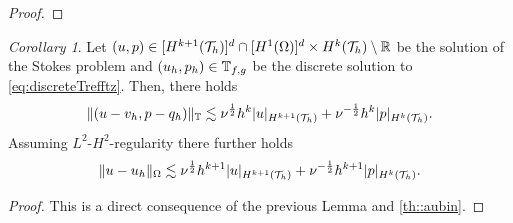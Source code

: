 \documentclass[pdflatex,sn-mathphys,Numbered]{sn-jnl}%
\theoremstyle{remark}%
\newtheorem{cor}[theorem]{Corollary}
\theoremstyle{definition}%
\begin{document}
\begin{proof}
\end{proof}



\begin{cor}
  Let $(u,p) \in [H^{k+1}({\mathcal{T}_h})]^d\cap [H^1(\Omega)]^d \times H^{k}({\mathcal{T}_h}) \setminus \mathbb{R}$ be the solution of the Stokes problem and $(u_h,p_h) \in \mathbb{T}_{f,g}$ be the discrete solution to \eqref{eq:discreteTrefftz}. 
  Then, there holds
  \begin{equation} \label{eq:aprioribound1}
    \Vert (u-v_h,p-q_h) \Vert_{\mathbb{T}} \lesssim \nu^{\frac12} h^{k} \vert u \vert_{H^{k+1}({\mathcal{T}_h})} + \nu^{-\frac12} h^{k} \vert p \vert_{H^{k}({\mathcal{T}_h})}.
  \end{equation}
  Assuming $L^2$-$H^2$-regularity there further holds
  \begin{equation}
    \Vert u-u_h \Vert_{\Omega} \lesssim \nu^{\frac12} h^{k+1} \vert u \vert_{H^{k+1}({\mathcal{T}_h})} + \nu^{-\frac12} h^{k+1} \vert p \vert_{H^{k}({\mathcal{T}_h})}.
  \end{equation}
\end{cor}    
\begin{proof}
  This is a direct consequence of the previous Lemma and \cref{th::aubin}.
\end{proof}
\end{document}
